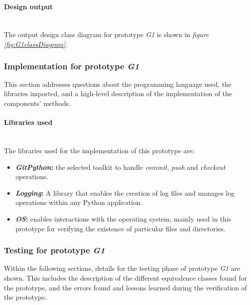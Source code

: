 \paragraph{Design output}\mbox{}\\

The output design class diagram for prototype \emph{G1} is shown in \emph{figure \ref{fig:G1classDiagram}}.

\subsubsection{Implementation for prototype \emph{G1}}

This section addresses questions about the programming language used, the libraries imported, and a high-level description of the implementation of the components' methods.

\paragraph{Libraries used} \mbox{}\\

The libraries used for the implementation of this prototype are:

\begin{itemize}

    \item \textbf{\emph{GitPython}: }the selected toolkit to handle \emph{commit}, \emph{push} and \emph{checkout} operations.
    \item \textbf{\emph{Logging}: }A library that enables the creation of log files and manages log operations within any Python application.
    \item \textbf{\emph{OS}: }enables interactions with the operating system, mainly used in this prototype for verifying the existence of particular files and directories.

\end{itemize}

\subsubsection{Testing for prototype \emph{G1}}

Within the following sections, details for the testing phase of prototype \emph{G1} are shown. This includes the description of the different equivalence classes found for the prototype, and the
errors found and lessons learned during the verification of the prototype.

